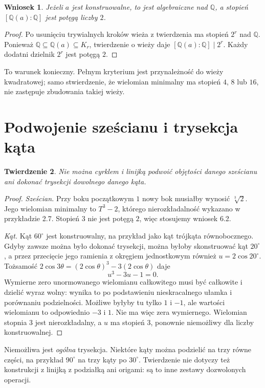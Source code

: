 \documentclass[11pt,a4paper,oneside]{book}
\numberwithin{equation}{section}
\theoremstyle{plain}
\newtheorem{twierdzenie}{Twierdzenie}[chapter]
\newtheorem{wniosek}[twierdzenie]{Wniosek}
\theoremstyle{definition}
\theoremstyle{remark}
\newcommand{\Q}{\mathbb{Q}}
\begin{document}
\begin{wniosek}
Jeżeli $a$ jest konstruowalne, to jest algebraiczne nad $\Q$, a stopień $[\Q(a):\Q]$ jest potęgą liczby $2$.
\end{wniosek}
\begin{proof}
Po usunięciu trywialnych kroków wieża z twierdzenia ma stopień $2^r$ nad $\Q$. Ponieważ $\Q\subseteq\Q(a)\subseteq K_r$, twierdzenie o wieży daje $[\Q(a):\Q]\mid 2^r$. Każdy dodatni dzielnik $2^r$ jest potęgą $2$.
\end{proof}

To warunek konieczny. Pełnym kryterium jest przynależność do wieży kwadratowej; samo stwierdzenie, że wielomian minimalny ma stopień $4$, $8$ lub $16$, nie zastępuje zbudowania takiej wieży.

\section{Podwojenie sześcianu i trysekcja kąta}

\begin{twierdzenie}
Nie można cyrklem i linijką podwoić objętości danego sześcianu ani dokonać trysekcji dowolnego danego kąta.
\end{twierdzenie}
\begin{proof}
\emph{Sześcian.} Przy boku początkowym $1$ nowy bok musiałby wynosić $\sqrt[3]{2}$. Jego wielomian minimalny to $T^3-2$, którego nierozkładalność wykazano w przykładzie 2.7. Stopień $3$ nie jest potęgą $2$, więc stosujemy wniosek 6.2.

\emph{Kąt.} Kąt $60^\circ$ jest konstruowalny, na przykład jako kąt trójkąta równobocznego. Gdyby zawsze można było dokonać trysekcji, można byłoby skonstruować kąt $20^\circ$, a przez przecięcie jego ramienia z okręgiem jednostkowym również $u=2\cos20^\circ$. Tożsamość $2\cos3\theta=(2\cos\theta)^3-3(2\cos\theta)$ daje
\[
u^3-3u-1=0.
\]
Wymierne zero unormowanego wielomianu całkowitego musi być całkowite i dzielić wyraz wolny: wynika to po podstawieniu nieskracalnego ułamka i porównaniu podzielności. Możliwe byłyby tu tylko $1$ i $-1$, ale wartości wielomianu to odpowiednio $-3$ i $1$. Nie ma więc zera wymiernego. Wielomian stopnia $3$ jest nierozkładalny, a $u$ ma stopień $3$, ponownie niemożliwy dla liczby konstruowalnej.
\end{proof}

Niemożliwa jest \emph{ogólna} trysekcja. Niektóre kąty można podzielić na trzy równe części, na przykład $90^\circ$ na trzy kąty po $30^\circ$. Twierdzenie nie dotyczy też konstrukcji z linijką z podziałką ani origami: są to inne zestawy dozwolonych operacji.
\end{document}
